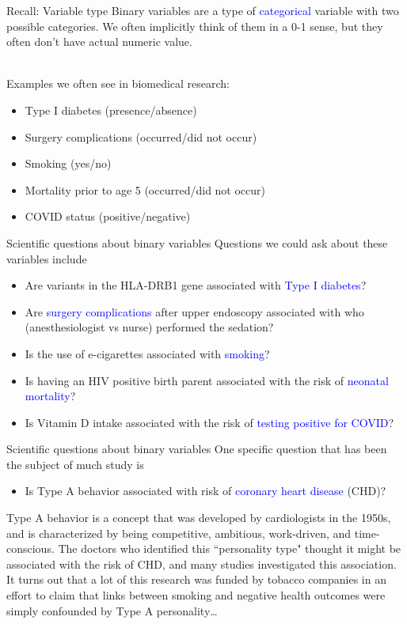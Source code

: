 \documentclass[10pt,t]{beamer}
\begin{document}
\begin{frame}{Recall: Variable type}
Binary variables are a type of \textcolor{blue}{categorical} variable with two possible categories. We often implicitly think of them in a 0-1 sense, but they often don't have actual numeric value. 
\\~\

Examples we often see in biomedical research: 
\begin{itemize}
	\item Type I diabetes (presence/absence)
	\item Surgery complications (occurred/did not occur)
	\item Smoking (yes/no)
	\item Mortality prior to age 5 (occurred/did not occur)
	\item COVID status (positive/negative)
\end{itemize}
\end{frame}

\begin{frame}{Scientific questions about binary variables}
	Questions we could ask about these variables include
	\begin{itemize}
		\item Are variants in the HLA-DRB1 gene associated with \textcolor{blue}{Type I diabetes}? 
		\item Are \textcolor{blue}{surgery complications} after upper endoscopy associated with who (anesthesiologist vs nurse) performed the sedation?
		\item Is the use of e-cigarettes associated with \textcolor{blue}{smoking}?
		\item Is having an HIV positive birth parent associated with the risk of \textcolor{blue}{neonatal mortality}?
		\item Is Vitamin D intake associated with the risk of \textcolor{blue}{testing positive for COVID}?
	\end{itemize}
\end{frame}

\begin{frame}{Scientific questions about binary variables}
	One specific question that has been the subject of much study is 
	\begin{itemize}
		\item Is Type A behavior associated with risk of \textcolor{blue}{coronary heart disease} (CHD)?
	\end{itemize}
	\vspace{0.7cm}
	Type A behavior is a concept that was developed by cardiologists in the 1950s, and is characterized by being competitive, ambitious, work-driven, and time-conscious. The doctors who identified this ``personality type" thought it might be associated with the risk of CHD, and many studies investigated this association. 
	\vfill
	\footnotesize{It turns out that a lot of this research was funded by tobacco companies in an effort to claim that links between smoking and negative health outcomes were simply confounded by Type A personality\dots}
\end{frame}
\end{document}
